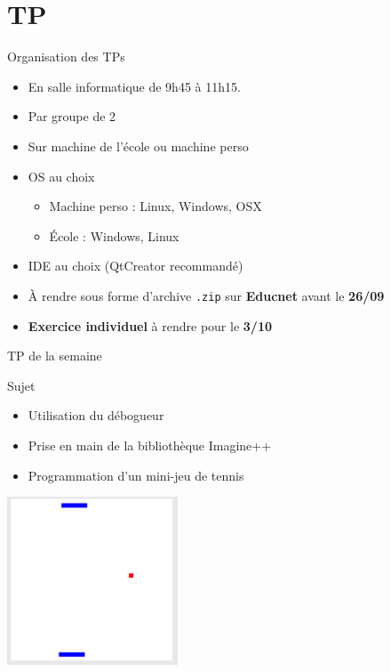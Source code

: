 \section{TP}

\begin{frame}{Organisation des TPs}
    \begin{itemize}
        \item En salle informatique de 9h45 à 11h15.
        \item Par groupe de 2
        \item Sur machine de l'école ou machine perso
        \item OS au choix
            \begin{itemize}
                \item Machine perso : Linux, Windows, OSX
                \item École : Windows, Linux
            \end{itemize}
        \item IDE au choix (QtCreator recommandé)
        \item \alert<+>{À rendre sous forme d'archive \texttt{.zip} sur \textbf{Educnet} avant le \textbf{26/09}}
        \item \alert<+>{\textbf{Exercice individuel} à rendre pour le \textbf{3/10}}
    \end{itemize}
\end{frame}

\begin{frame}{TP de la semaine}

	\begin{block}{Sujet}
        \begin{itemize}
            \item Utilisation du débogueur
            \item Prise en main de la bibliothèque Imagine++
            \item Programmation d'un mini-jeu de tennis
        \end{itemize}
	\end{block}
  \begin{center}
    \includegraphics[width=0.38\textwidth]{images/tennis}
  \end{center}
\end{frame}



